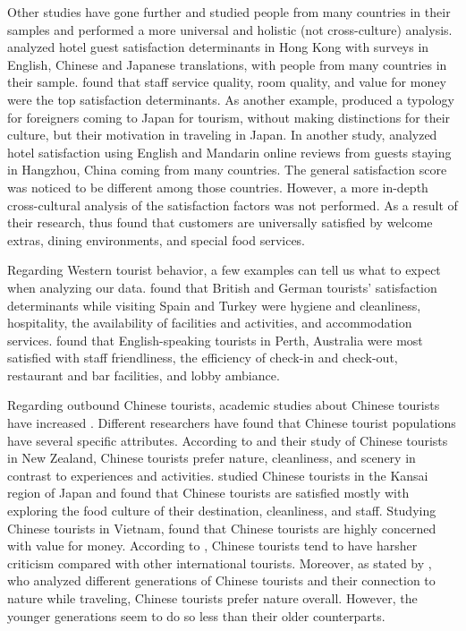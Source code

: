 \documentclass[smallextended,natbib]{svjour3}       %
\begin{document}
    Other studies have gone further and studied people from many countries in their samples and performed a more universal and holistic (not cross-culture) analysis. \cite{choi2001} analyzed hotel guest satisfaction determinants in Hong Kong with surveys in English, Chinese and Japanese translations, with people from many countries in their sample. \cite{choi2001} found that staff service quality, room quality, and value for money were the top satisfaction determinants. As another example, \cite{Uzama2012} produced a typology for foreigners coming to Japan for tourism, without making distinctions for their culture, but their motivation in traveling in Japan. In another study, \cite{zhou2014} analyzed hotel satisfaction using English and Mandarin online reviews from guests staying in Hangzhou, China coming from many countries. The general satisfaction score was noticed to be different among those countries. However, a more in-depth cross-cultural analysis of the satisfaction factors was not performed. As a result of their research, \cite{zhou2014} thus found that customers are universally satisfied by welcome extras, dining environments, and special food services. 

    Regarding Western tourist behavior, a few examples can tell us what to expect when analyzing our data. \cite{kozak2002} found that British and German tourists' satisfaction determinants while visiting Spain and Turkey were hygiene and cleanliness, hospitality, the availability of facilities and activities, and accommodation services. \cite{shanka2004} found that English-speaking tourists in Perth, Australia were most satisfied with staff friendliness, the efficiency of check-in and check-out, restaurant and bar facilities, and lobby ambiance. 

    Regarding outbound Chinese tourists, academic studies about Chinese tourists have increased \cite[][]{sun2017}. Different researchers have found that Chinese tourist populations have several specific attributes. According to \cite{ryan2001} and their study of Chinese tourists in New Zealand, Chinese tourists prefer nature, cleanliness, and scenery in contrast to experiences and activities. \cite{dongyang2015} studied Chinese tourists in the Kansai region of Japan and found that Chinese tourists are satisfied mostly with exploring the food culture of their destination, cleanliness, and staff. Studying Chinese tourists in Vietnam, \cite{truong2009} found that Chinese tourists are highly concerned with value for money. According to \cite{liu2019}, Chinese tourists tend to have harsher criticism compared with other international tourists. Moreover, as stated by \cite{gao2017chinese}, who analyzed different generations of Chinese tourists and their connection to nature while traveling, Chinese tourists prefer nature overall. However, the younger generations seem to do so less than their older counterparts. 
\end{document}

